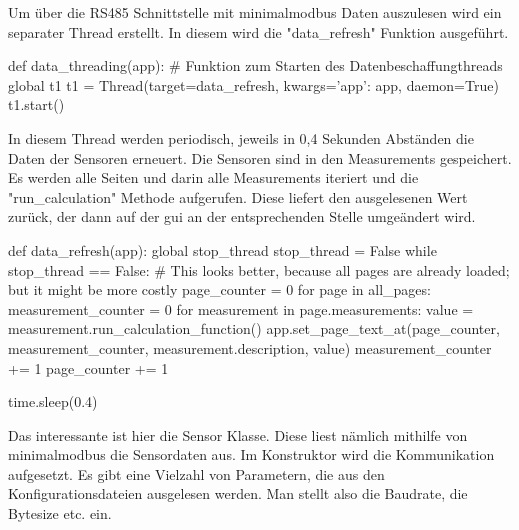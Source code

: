 Um über die RS485 Schnittstelle mit minimalmodbus Daten auszulesen wird ein separater Thread erstellt. In diesem wird die "data_refresh" Funktion ausgeführt. 

\begin{pythoncode}	
def data_threading(app):
	# Funktion zum Starten des Datenbeschaffungthreads
	global t1
	t1 = Thread(target=data_refresh, kwargs={'app': app}, daemon=True)
	t1.start()
\end{pythoncode}

In diesem Thread werden periodisch, jeweils in 0,4 Sekunden Abständen die Daten der Sensoren erneuert. Die Sensoren sind in den Measurements gespeichert. Es werden alle Seiten und darin alle Measurements iteriert und die "run_calculation" Methode aufgerufen. Diese liefert den ausgelesenen Wert zurück, der dann auf der \acs{gui} an der entsprechenden Stelle umgeändert wird.

\begin{pythoncode}
def data_refresh(app):
	global stop_thread
	stop_thread = False
	while stop_thread == False:
		# This looks better, because all pages are already loaded; but it might be more costly
		page_counter = 0
		for page in all_pages:
			measurement_counter = 0
			for measurement in page.measurements:
				value = measurement.run_calculation_function()
				app.set_page_text_at(page_counter, measurement_counter, measurement.description, value)
				measurement_counter += 1
			page_counter += 1
		
		time.sleep(0.4)
\end{pythoncode}

Das interessante ist hier die Sensor Klasse. Diese liest nämlich mithilfe von minimalmodbus die Sensordaten aus. Im Konstruktor wird die Kommunikation aufgesetzt. Es gibt eine Vielzahl von Parametern, die aus den Konfigurationsdateien ausgelesen werden. Man stellt also die Baudrate, die Bytesize etc. ein.

